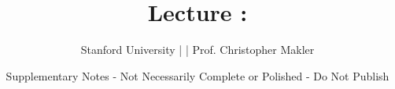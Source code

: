 \title{Lecture \lectureNumber{}: \topic{}}
\date{Supplementary Notes - Not Necessarily Complete or Polished - Do Not Publish}
\author{Stanford University | \course{} | Prof. Christopher Makler}

\maketitle
\setcounter{section}{\lectureNumber{}}
